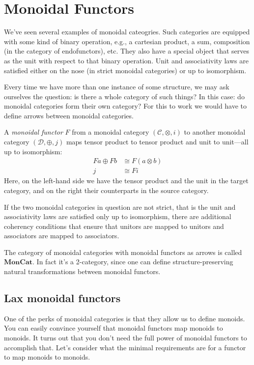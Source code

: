 \documentclass[DaoFP]{subfiles}
\begin{document}
\section{Monoidal Functors}

We've seen several examples of monoidal cateogries. Such categories are equipped with some kind of binary operation, e.g., a cartesian product, a sum, composition (in the category of endofunctors), etc. They also have a special object that serves as the unit with respect to that binary operation. Unit and associativity laws are satisfied either on the nose (in strict monoidal categories) or up to isomorphism.

Every time we have more than one instance of some structure, we may ask ourselves the question: is there a whole category of such things? In this case: do monoidal categories form their own category? For this to work we would have to define arrows between monoidal categories.

A \emph{monoidal functor} $F$ from a monoidal category $(\mathcal{C}, \otimes, i)$ to another monoidal category $(\mathcal{D}, \oplus, j)$ maps tensor product to tensor product and unit to unit---all up to isomorphism:
\begin{align*}
F a \oplus F b &\cong F (a \otimes b) \\
j &\cong F i 
\end{align*}
Here, on the left-hand side we have the tensor product and the unit in the target category, and on the right their counterparts in the source category. 

If the two monoidal categories in question are not strict, that is the unit and associativity laws are satisfied only up to isomorphism, there are additional coherency conditions that ensure that unitors are mapped to unitors and associators are mapped to associators.

The category of monoidal categories with monoidal functors as arrows is called $\mathbf{MonCat}$. In fact it's a 2-category, since one can define structure-preserving natural transformations between monoidal functors.

\subsection{Lax monoidal functors}

One of the perks of monoidal categories is that they allow us to define monoids. You can easily convince yourself that monoidal functors map monoids to monoids. It turns out that you don't need the full power of monoidal functors to accomplish that. Let's consider what the minimal requirements are  for a functor to map monoids to monoids. 
\end{document}
